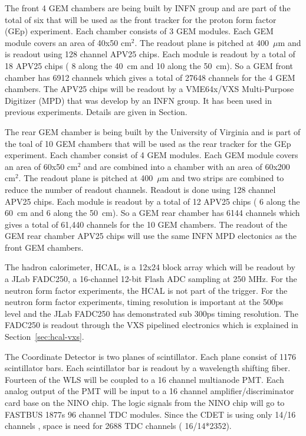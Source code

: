 \documentclass[]{article}
\begin{document}
 The front 4 GEM chambers are being built by INFN group and are part of the total of six that
 will be used as the front tracker for the proton form factor (GEp) experiment. Each chamber consists
 of 3 GEM modules. Each GEM module covers an area of 40x50 cm$^2$. The readout plane is pitched at 400~$\mu$m
 and is readout using 128 channel APV25 chips. Each module is readout by a total of 18 APV25 chips ( 8 along
 the 40~cm and 10 along the 50~cm). So a GEM front chamber has 6912 channels which gives a total of 27648 channels
 for the 4 GEM chambers. The APV25 chips will be readout by a VME64x/VXS Multi-Purpose Digitizer (MPD) that was
 develop by an INFN group. It has been used in previous experiments. Details are given in Section.
 
 The rear GEM chamber is being built by the University of Virginia and is part of the toal of 10 GEM chambers
 that will be used as the rear tracker for the GEp experiment. Each chamber consist of 4 GEM modules.
 Each GEM module covers an area of 60x50 cm$^2$ and are combined into a chamber with an area
 of 60x200 cm$^2$. The readout plane is pitched at 400~$\mu$m and two strips are combined to reduce
 the number of readout channels. Readout is done using 128 channel APV25 chips. Each module is readout 
 by a total of  12 APV25 chips (  6 along the 60~cm and 6 along the 50~cm). So a GEM rear chamber has  
 6144 channels which gives a total of 61,440 channels for the 10 GEM chambers. The readout of the GEM
 rear chamber APV25 chips will use the same INFN MPD electonics as the front GEM chambers.  
 
 The hadron calorimeter, HCAL, is a 12x24 block array which will be readout 
 by a JLab FADC250, a 16-channel 12-bit Flash 
 ADC sampling at 250 MHz. For the neutron form factor experiments, the HCAL is not part of the trigger. For the
 neutron form factor experiments, timing resolution is important at the 500ps level and the JLab FADC250 has 
 demonstrated sub 300ps timing resolution. The FADC250 is readout through the VXS pipelined electronics
 which is explained in Section~\ref{sec:hcal-vxs}.
 
 
 The Coordinate Detector is  two planes of scintillator. Each plane consist of 1176 scintillator bars. 
 Each scintillator bar is readout by a wavelength shifting fiber. Fourteen of the WLS  will be coupled to
 a 16 channel multianode PMT. Each analog output of the PMT will be input to a 16 channel amplifier/discriminator
 card base on the NINO chip. The logic signals from the NINO chip will go to FASTBUS 1877s 96 channel TDC modules.
 Since the CDET is using only 14/16 channels , space is need for 2688 TDC channels ( 16/14*2352).
 
\end{document}
